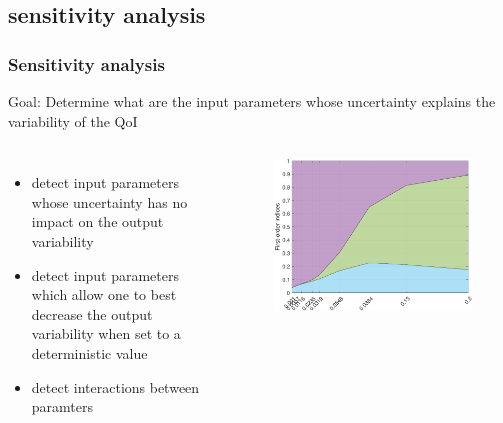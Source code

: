 \subsection{sensitivity analysis}
\begin{frame}
\frametitle{Sensitivity analysis}
\begin{block}{Goal:}
Determine what are the input parameters whose uncertainty explains the variability of the QoI    
\end{block}

\begin{columns}
    \begin{itemize}
        \item detect input parameters whose uncertainty has \alert{no impact} on the output variability
        \item detect input parameters which allow one to best \alert{decrease the output variability} when set to a deterministic value
        \item detect interactions between paramters
    \end{itemize}
\begin{figure}          \includegraphics[scale=0.45]{figures/figure-Sobol.pdf}
\end{figure} 
\end{columns}

\end{frame}
